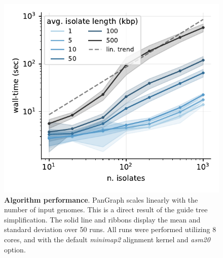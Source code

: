 \documentclass[aps,rmp,preprint,superscriptaddress,10pt,linenumbers]{revtex4-1}
\begin{document}
\begin{figure}[tb]
    \includegraphics[width=.4\textwidth]{figs/benchmark.pdf}
    \caption{{\bf Algorithm performance}.
        PanGraph scales linearly with the number of input genomes.
        This is a direct result of the guide tree simplification.
        The solid line and ribbons display the mean and standard deviation over 50 runs.
        All runs were performed utilizing 8 cores, and with the default \textit{minimap2} alignment kernel and \textit{asm20} option.
    }
    \label{fig:toy-performance}
\end{figure}
\end{document}
